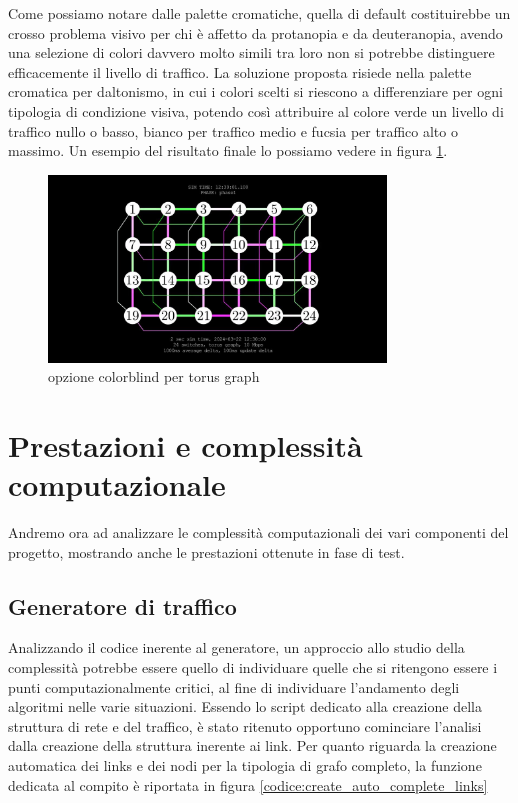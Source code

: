 \documentclass[binding=0.6cm]{sapthesis}
\begin{document}
Come possiamo notare dalle palette cromatiche, quella di default costituirebbe un crosso problema visivo per chi è affetto da protanopia e da deuteranopia, avendo
una selezione di colori davvero molto simili tra loro non si potrebbe distinguere efficacemente il livello di traffico. La soluzione proposta
risiede nella palette cromatica per daltonismo, in cui i colori scelti si riescono a differenziare per ogni tipologia di condizione visiva, potendo così
attribuire al colore verde un livello di traffico nullo o basso, bianco per traffico medio e fucsia per traffico alto o massimo. Un esempio
del risultato finale lo possiamo vedere in figura \ref{fig:colorblind_torus}.

\begin{figure}[h]
    \centering
    \includegraphics[width=0.8\textwidth]{immagini/colorblind_torus.JPG}
    \caption{opzione colorblind per torus graph}
    \label{fig:colorblind_torus}
\end{figure}

\chapter{Prestazioni e complessità computazionale}

Andremo ora ad analizzare le complessità computazionali dei vari componenti del progetto, mostrando anche le prestazioni ottenute in fase di test.

\section{Generatore di traffico}
Analizzando il codice inerente al generatore, un approccio allo studio della complessità potrebbe essere quello di individuare quelle che si ritengono essere
i punti computazionalmente critici, al fine di individuare l'andamento degli algoritmi nelle varie situazioni. Essendo lo script dedicato alla creazione della struttura di rete e del traffico,
è stato ritenuto opportuno cominciare l'analisi dalla creazione della struttura inerente ai link.
Per quanto riguarda la creazione automatica dei links e dei nodi
per la tipologia di grafo completo, la funzione dedicata al compito è riportata in figura \ref{codice:create_auto_complete_links}
\end{document}
